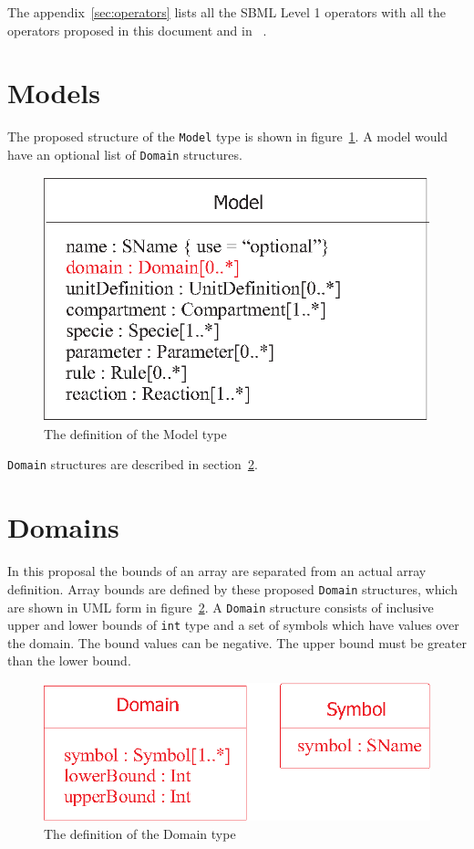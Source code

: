 \documentclass{cekarticle}
\begin{document}
The appendix~\ref{sec:operators} lists all the SBML Level 1
operators with all the operators proposed in this document and in
~\citet{finney:2002c}.

\section{Models}

The proposed structure of the \texttt{Model} type is shown in
figure~\ref{fig:model}. A model would have an optional list of
\texttt{Domain} structures.

\begin{figure}[h]
  \vspace*{8pt}
  \centering
  \includegraphics[scale = 0.7]{model}
  \caption{The definition of the Model type}
  \label{fig:model}
\end{figure}

\texttt{Domain} structures are described in
section~\ref{sec:domain}.

\section{Domains}
\label{sec:domain}

In this proposal the bounds of an array are separated from an
actual array definition.  Array bounds are defined by these
proposed \texttt{Domain} structures, which are shown in UML form
in figure~\ref{fig:domain}.  A \texttt{Domain} structure consists
of inclusive upper and lower bounds of \texttt{int} type and a
set of symbols which have values over the domain.  The bound
values can be negative.  The upper bound must be greater than the
lower bound.

\begin{figure}[h]
  \vspace*{8pt}
  \centering
  \includegraphics[scale = 0.7]{domain}
  \caption{The definition of the Domain type}
  \label{fig:domain}
\end{figure}
\end{document}
